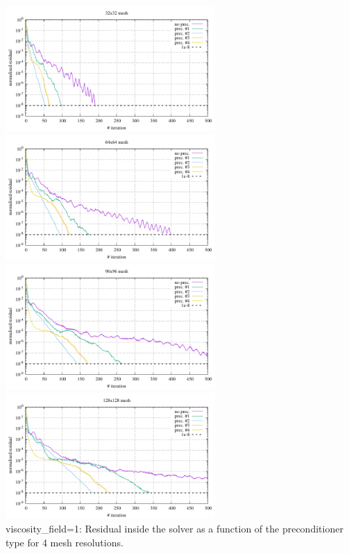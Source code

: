 \begin{center} 
\includegraphics[width=8cm]{python_codes/fieldstone_16/results/visc_field_1/residual_32x32.pdf}
\includegraphics[width=8cm]{python_codes/fieldstone_16/results/visc_field_1/residual_64x64.pdf}\\
\includegraphics[width=8cm]{python_codes/fieldstone_16/results/visc_field_1/residual_96x96.pdf}
\includegraphics[width=8cm]{python_codes/fieldstone_16/results/visc_field_1/residual_128x128.pdf}\\
{\captionfont viscosity\_field=1: Residual inside the solver as a function of the preconditioner type for
4 mesh resolutions.}
\end{center}

